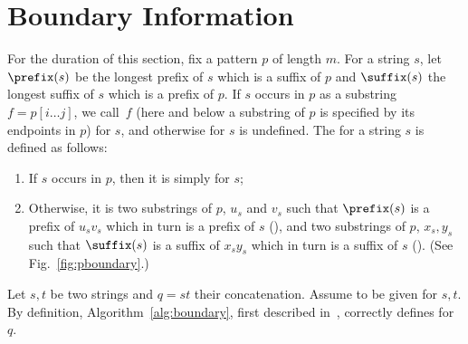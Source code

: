  
\section{Boundary Information}
For the duration of this section, fix a pattern $p$ of length $m$. 
For a string $s$, let $\prefix(s)$ be the longest prefix of $s$ which is a suffix of $p$ and $\suffix(s)$ the longest suffix of $s$ which is a prefix of $p$. If $s$ occurs in $p$ as a substring $f = p[i\dots j]$, we call~$f$ (here and below a substring of $p$ is specified by its endpoints in $p$) \emph{} for $s$, and otherwise  for $s$ is undefined. 
The \emph{} for a string $s$ is defined as follows:
\begin{enumerate}
\item If $s$ occurs in $p$, then it is simply  for $s$;
\item Otherwise, it is two substrings of $p$, $u_s$ and $v_s$ such that $\prefix(s)$ is a prefix of $u_s v_s$ which in turn is a prefix of $s$ (\emph{}), and two substrings of $p$, $x_s, y_s$ such that $\suffix(s)$ is a suffix of $x_s y_s$ which in turn is a suffix of $s$ (\emph{}). (See Fig.~\ref{fig:pboundary}.)
\end{enumerate}


Let $s, t$ be two strings and $q = st$ their concatenation. Assume to be given  for $s, t$. By definition, Algorithm~\ref{alg:boundary}, first described in~\cite{DBLP:conf/soda/GanardiG22}, correctly defines  for $q$.

